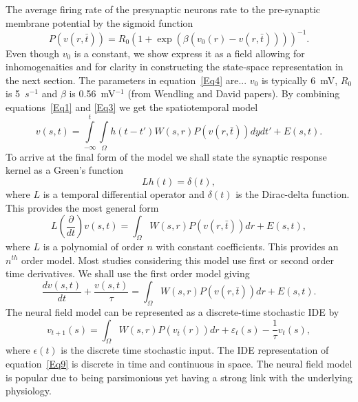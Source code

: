 \documentclass[journal]{IEEEtran}
\begin{document}
The average firing rate of the presynaptic neurons rate to the pre-synaptic membrane potential by the sigmoid function
\begin{equation}\label{Eq4}
P\left( {v\left( {r,\bar t} \right)} \right) = {R_0}{\left( {1 + \exp \left( {\beta \left( {{v_0}\left( r \right) - v\left( {r,\bar t} \right)} \right)} \right)} \right)^{ - 1}}.
\end{equation}
Even though $v_0$ is a constant, we show express it as a field allowing for inhomogenaities and for clarity in constructing the state-space representation in the next section. The parameters in equation~\ref{Eq4} are... $v_0$ is typically 6~mV, $R_0$ is 5~$s^{-1}$ and $\beta$ is 0.56~mV$^{-1}$ (from Wendling and David papers). By combining equations~\ref{Eq1} and \ref{Eq3} we get the spatiotemporal model
\begin{equation}\label{Eq5}
v\left( {s,t} \right) = \int\limits_{ - \infty }^t {\int\limits_\Omega  {h\left( {t - t'} \right)W\left( {s,r} \right)P\left( {v\left( {r,\bar t} \right)} \right)dy} dt'}  + E\left( {s,t} \right).
\end{equation}
To arrive at the final form of the model we shall state the synaptic response kernel as a Green's function
\begin{equation}\label{Eq6}
Lh\left( t \right) = \delta \left( t \right),
\end{equation}
where $L$ is a temporal differential operator and $\delta(t)$ is the Dirac-delta function. This provides the most general form
\begin{equation}\label{Eq7}
L\left( {\frac{\partial }{{dt}}} \right)v\left( {s,t} \right) = \int_\Omega  {W\left( {s,r} \right)P\left( {v\left( {r,\bar t} \right)} \right)dr}  + E\left( {s,t} \right),
\end{equation}
where $L$ is a polynomial of order $n$ with constant coefficients. This provides an $n^{th}$ order model. Most studies considering this model use first or second order time derivatives. We shall use the first order model giving
\begin{equation}\label{Eq8}
\frac{{dv\left( {s,t} \right)}}{{dt}} + \frac{{v\left( {s,t} \right)}}{\tau } = \int_\Omega  {W\left( {s,r} \right)P\left( {v\left( {r,\bar t} \right)} \right)dr}  + E\left( {s,t} \right).
\end{equation}
The neural field model can be represented as a discrete-time stochastic IDE by
\begin{equation}\label{Eq9}
{v_{t + 1}}\left( s \right) = \int_\Omega  {W\left( {s,r} \right)P\left( {{v_{\bar t}}\left( r \right)} \right)dr}  + {\varepsilon _t}\left( s \right) - \frac{1}{\tau }{v_t}\left( s \right),
\end{equation}
where $\epsilon(t)$ is the discrete time stochastic input. The IDE representation of equation~\ref{Eq9} is discrete in time and continuous in space. The neural field model is popular due to being parsimonious yet having a strong link with the underlying physiology.
\end{document}
